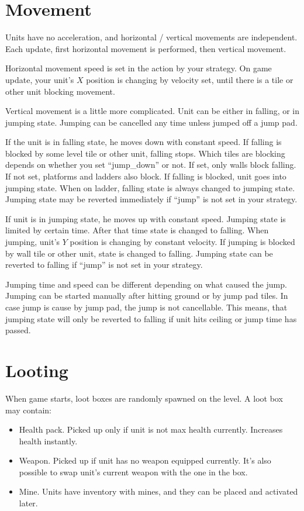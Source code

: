 \section{Movement}

Units have no acceleration, and horizontal / vertical movements are independent.
Each update, first horizontal movement is performed, then vertical movement.

Horizontal movement speed is set in the action by your strategy.
On game update, your unit's $X$ position is changing by velocity set, until there is a tile or other unit blocking movement.

Vertical movement is a little more complicated. Unit can be either in falling, or in jumping state.
Jumping can be cancelled any time unless jumped off a jump pad.

If the unit is in falling state, he moves down with constant speed.
If falling is blocked by some level tile or other unit, falling stops.
Which tiles are blocking depends on whether you set ``jump\_down'' or not.
If set, only walls block falling. If not set, platforms and ladders also block.
If falling is blocked, unit goes into jumping state.
When on ladder, falling state is always changed to jumping state.
Jumping state may be reverted immediately if ``jump'' is not set in your strategy.

If unit is in jumping state, he moves up with constant speed.
Jumping state is limited by certain time. After that time state is changed to falling.
When jumping, unit's $Y$ position is changing by constant velocity.
If jumping is blocked by wall tile or other unit, state is changed to falling.
Jumping state can be reverted to falling if ``jump'' is not set in your strategy.

Jumping time and speed can be different depending on what caused the jump.
Jumping can be started manually after hitting ground or by jump pad tiles.
In case jump is cause by jump pad, the jump is not cancellable.
This means, that jumping state will only be reverted to falling if unit hits ceiling or jump time has passed.

\section{Looting}

When game starts, loot boxes are randomly spawned on the level. A loot box may contain:
\begin{itemize}
      \item Health pack. Picked up only if unit is not max health currently.
            Increases health instantly.
      \item Weapon. Picked up if unit has no weapon equipped currently.
            It's also possible to swap unit's current weapon with the one in the box.
      \item Mine. Units have inventory with mines, and they can be placed and activated later.
\end{itemize}

